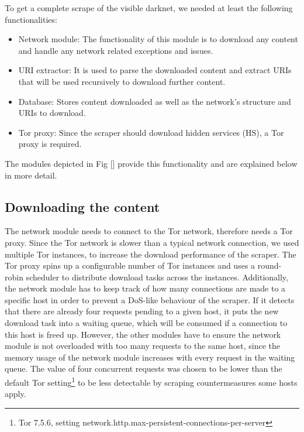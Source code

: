 \documentclass[USenglish,oneside,twocolumn]{article}
\begin{document}
To get a complete scrape of the visible darknet, we needed at least the following functionalities:
\begin{itemize}
    \item Network module: The functionality of this module is to download any content and handle any network related exceptions and issues.
    \item URI extractor: It is used to parse the downloaded content and extract URIs that will be used recursively to download further content.
    \item Database: Stores content downloaded as well as the network's structure and URIs to download.
    \item Tor proxy: Since the scraper should download hidden services (HS), a Tor proxy is required.
\end{itemize}

The modules depicted in Fig [] provide this functionality and are explained below in more detail.
\subsection{Downloading the content}
The network module needs to connect to the Tor network, therefore needs a Tor proxy. Since the Tor network is slower than a typical network connection, we used multiple Tor instances, to increase the download performance of the scraper. The Tor proxy spins up a configurable number of Tor instances and uses a round-robin scheduler to distribute download tasks across the instances.
Additionally, the network module has to keep track of how many connections are made to a specific host in order to prevent a DoS-like behaviour of the scraper. If it detects that there are already four requests pending to a given host, it puts the new download task into a waiting queue, which will be consumed if a connection to this host is freed up. However, the other modules have to ensure the network module is not overloaded with too many requests to the same host, since the memory usage of the network module increases with every request in the waiting queue. The value of four concurrent requests was chosen to be lower than the default Tor setting\footnote{Tor 7.5.6, setting network.http.max-persistent-connections-per-server} to be less detectable by scraping countermeasures some hosts apply.
\end{document}
